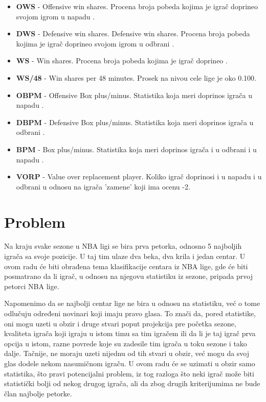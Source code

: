 \documentclass[a4paper]{article}
\begin{document}
\begin{itemize}
	\item \textbf{OWS} - Offensive win shares. Procena broja pobeda kojima je igrač doprineo svojom igrom u napadu \cite{ws}.
	\item \textbf{DWS} - Defensive win shares. Defensive win shares. Procena broja pobeda kojima je igrač doprineo svojom igrom u odbrani \cite{ws}.
	\item \textbf{WS} - Win shares. Procena broja pobeda kojima je igrač doprineo \cite{ws}.
	\item \textbf{WS/48} - Win shares per 48 minutes. Prosek na nivou cele lige je oko 0.100.
	\item \textbf{OBPM} - Offensive Box plus/minus. Statistika koja meri doprinos igrača u napadu \cite{bpm}.
	\item \textbf{DBPM} - Defensive Box plus/minus. Statistika koja meri doprinos igrača u odbrani \cite{bpm}.
	\item \textbf{BPM} - Box plus/minus. Statistika koja meri doprinos igrača i u odbrani i u napadu \cite{bpm}.
	\item \textbf{VORP} - Value over replacement player. Koliko igrač doprinosi i u napadu i u odbrani u odnosu na igrača ’zamene’ koji ima ocenu -2. \cite{bpm}
\end{itemize}

\section{Problem}
\label{sec:problem}

	Na kraju svake sezone u NBA ligi se bira prva petorka, odnosno 5 najboljih
igrača sa svoje pozicije. U taj tim ulaze dva beka, dva krila i jedan centar. U
ovom radu će biti obrađena tema klasifikacije centara iz NBA lige, gde će biti
posmatrano da li igrač, u odnosu na njegovu statistiku iz sezone, pripada prvoj
petorci NBA lige.

Napomenimo da se najbolji centar lige ne bira u odnosu na
statistiku, već o tome odlučuju određeni novinari koji imaju pravo glasa. To znači da, pored statistike, oni mogu uzeti u obzir i druge stvari poput projekcija
pre početka sezone, kvaliteta igrača koji igraju u istom timu sa tim igračem ili da li je taj igrač prva opcija u istom, razne povrede koje su zadesile tim igrača u toku sezone i tako dalje. Tačnije, ne moraju uzeti nijednu od tih stvari u obzir, već mogu da svoj glas dodele nekom nasumičnom igraču. U ovom radu će se uzimati u obzir samo statistika, što pravi potencijalni problem, iz tog razloga što neki igrač može biti statistički bolji od nekog drugog igrača, ali da zbog drugih kriterijumima ne bude član najbolje petorke.
\end{document}
